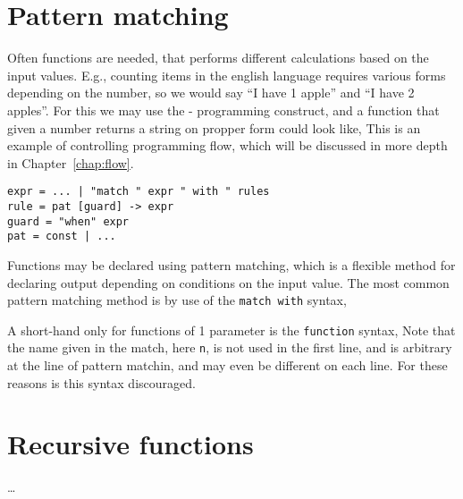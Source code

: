 \section{Pattern matching}
Often functions are needed, that performs different calculations based on the input values. E.g., counting items in the english language requires various forms depending on the number, so we would say ``I have 1 apple'' and ``I have 2 apples''. For this we may use the - programming construct, and a function that given a number returns a string on propper form could look like,
%
%
This is an example of controlling programming flow, which will be discussed in more depth in Chapter~\ref{chap:flow}.
\begin{lstlisting}[language=ebnf]
expr = ... | "match " expr " with " rules 
rule = pat [guard] -> expr
guard = "when" expr
pat = const | ...     
\end{lstlisting}

Functions may be declared using pattern matching, which is a flexible method for declaring output depending on conditions on the input value. The most common pattern matching method is by use of the \texttt{match with} syntax,

A short-hand only for functions of 1 parameter is the \texttt{function} syntax,
Note that the name given in the match, here \texttt{n}, is not used in the first line, and is arbitrary at the line of pattern matchin, and may even be different on each line. For these reasons is this syntax discouraged.

\section{Recursive functions}

\dots

